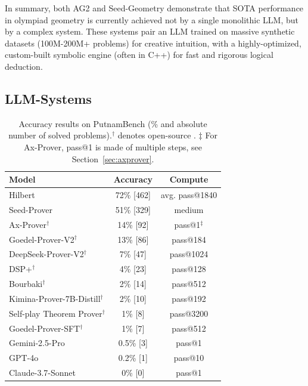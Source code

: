 \documentclass[12pt, letterpaper]{article}
\begin{document}
\medskip

In summary, both AG2 and Seed-Geometry demonstrate that SOTA performance in olympiad geometry is currently achieved not by a single monolithic LLM, but by a complex system. These systems pair an LLM trained on massive synthetic datasets (100M-200M+ problems) for creative intuition, with a highly-optimized, custom-built symbolic engine (often in C++) for fast and rigorous logical deduction.

\subsection{LLM-Systems}
\label{sec:proofsystems}

\begin{table} %
 \vspace{-10pt} %
 \centering
 \setlength{\tabcolsep}{4pt}
 \begin{tabular}{lcc}
 \toprule
 \textbf{Model} & \textbf{Accuracy} & \textbf{Compute} \\
 \midrule
 Hilbert & 72\% [462] & avg. pass@1840 \\
 Seed-Prover & 51\% [329] & medium \\
 {Ax-Prover}$^\dagger$ & {14}\% [92] & pass@1$^\ddagger$\\
 Goedel-Prover-V2$^\dagger$ & 13\% [86] & pass@184 \\
 DeepSeek-Prover-V2$^\dagger$ & 7\% [47] & pass@1024 \\
 DSP+$^\dagger$ & 4\% [23] & pass@128 \\
 Bourbaki$^\dagger$ & 2\% [14] & pass@512 \\
 Kimina-Prover-7B-Distill$^\dagger$ & 2\% [10] & pass@192 \\
 Self-play Theorem Prover$^\dagger$ & 1\% [8] & pass@3200 \\
 Goedel-Prover-SFT$^\dagger$ & 1\% [7] & pass@512 \\
 \hline
 Gemini-2.5-Pro & 0.5\% [3] & pass@1 \\
 GPT-4o & 0.2\% [1] & pass@10 \\
 Claude-3.7-Sonnet & 0\% [0] & pass@1 \\
 \hline
 \end{tabular}
 \vspace{-10pt} %
 \caption{Accuracy results on PutnamBench (\% and absolute number of solved problems).$^\dagger$ denotes open-source \cite{tsoukalas2024putnambenchevaluatingneuraltheoremprovers}. $\ddagger$ For Ax-Prover, pass@1 is made of multiple steps, see Section~\ref{sec:axprover}.}
 \label{tab:putnam_results}
 \end{table}
\end{document}
